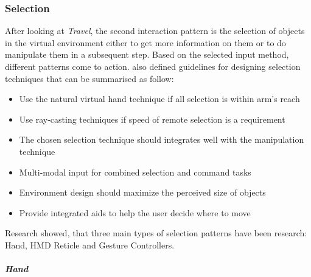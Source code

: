 
\subsubsection{Selection}

After looking at \textit{Travel}, the second interaction pattern is the selection of objects in the virtual environment either to get more information on them or to do manipulate them in a subsequent step. Based on the selected input method, different patterns come to action. \newline
\cite{Bowman2002} also defined guidelines for designing selection techniques that can be summarised as follow:
\begin{itemize}[noitemsep,nolistsep]
	\item Use the natural virtual hand technique if all selection is within arm's reach
	\item Use ray-casting techniques if speed of remote selection is a requirement
	\item The chosen selection technique should integrates well with the manipulation technique
	\item Multi-modal input for combined selection and command tasks
	\item Environment design should maximize the perceived size of objects
	\item Provide integrated aids to help the user decide where to move
\end{itemize}

Research showed, that three main types of selection patterns have been research: Hand, HMD Reticle and Gesture Controllers.

\subparagraph{Hand}

